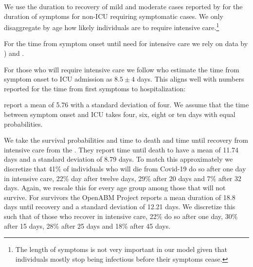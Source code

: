 
We use the duration to recovery of mild and moderate cases reported by \cite[Figure~S3,
Panel~2]{Bi2020} for the duration of symptoms for non-ICU requiring symptomatic cases.
We only disaggregate by age how likely individuals are to require intensive
care.\footnote{The length of symptoms is not very important in our model given that
individuals mostly stop being infectious before their symptoms cease.}


For the time from symptom onset until need for intensive care we rely on data by
\cite{Stokes2020}) and \citep{Hinch2021}.

For those who will require intensive care we follow \citet{Chen2020} who estimate the
time from symptom onset to ICU admission as $8.5 \pm 4$ days. This aligns well with
numbers reported for the time from first symptoms to hospitalization:

\citet{Gaythorpe2020} report a mean of 5.76 with a standard deviation of four. We assume
that the time between symptom onset and ICU takes four, six, eight or ten days with
equal probabilities.


We take the survival probabilities and time to death and time until recovery from
intensive care from the \citet{Hinch2021}. They report time until death to have a mean
of 11.74 days and a standard deviation of 8.79 days. To match this approximately we
discretize that 41\% of individuals who will die from Covid-19 do so after one day in
intensive care, 22\% day after twelve days, 29\% after 20 days and 7\% after 32 days.
Again, we rescale this for every age group among those that will not survive. For
survivors the OpenABM Project reports a mean duration of 18.8 days until recovery and a
standard deviation of 12.21 days. We discretize this such that of those who recover in
intensive care, 22\% do so after one day, 30\% after 15 days, 28\% after 25 days and
18\% after 45 days.

\FloatBarrier
